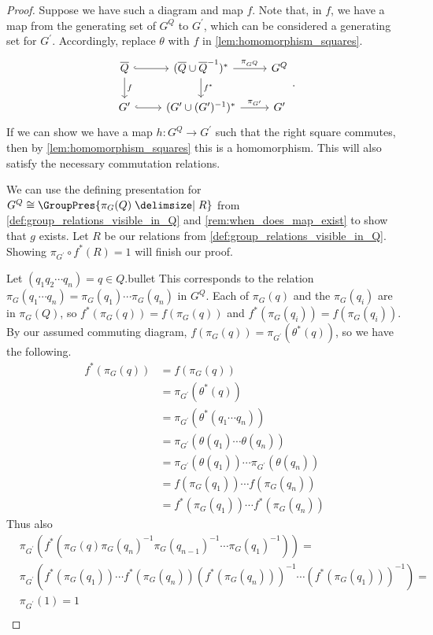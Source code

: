 \begin{proof}
	Suppose we have such a diagram and map $f$. Note that, in $f$, we have a map from the generating set of $G^Q$ to $G^\prime$, which can be considered a generating set for $G^\prime$. Accordingly, replace $\theta$ with  $f$ in \cref{lem:homomorphism_squares}.
	\[
		\begin{tikzcd}
			\overline{Q} \ar[d, "f"] \ar[r, hook] & (\overline{Q} \cup \overline{Q}^{-1})^* \ar[d, "f^*"] \ar[r, "\pi_{G^Q}"] & G^Q \\
			G^\prime \ar[r, hook] & (G^\prime \cup (G^\prime)^{-1})^* \ar[r, "\pi_{G^\prime}"] & G^\prime
		\end{tikzcd}
		.\]
	If we can show we have a map $h \colon G^Q \to G^\prime$ such that the right square commutes, then by \cref{lem:homomorphism_squares} this is a homomorphism. This will also satisfy the necessary commutation relations.

	We can use the defining presentation for $G^Q \cong \GroupPres{\pi_G(Q) \relations R}$ from \cref{def:group_relations_visible_in_Q} and \cref{rem:when_does_map_exist} to show that $g$ exists. Let $R$ be our relations from \cref{def:group_relations_visible_in_Q}. Showing $\pi_{G^\prime} \circ f^*\left( R \right) = 1 $ will finish our proof.

	Let $(q_1q_2\cdots q_n) = q \in Q$.bullet
	This corresponds to the relation $\pi_G(q_1\cdots q_n) = \pi_G(q_1)\cdots \pi_G(q_n) $ in $G^Q$.
	Each of $\pi_G(q)$ and the  $\pi_G(q_i)$ are in  $\pi_G(Q)$, so  $f^*(\pi_G(q)) = f(\pi_G(q))$ and  $f^*(\pi_G(q_i)) = f(\pi_G(q_i))$.
	By our assumed commuting diagram,  $f(\pi_G(q)) = \pi_{G^\prime}(\theta^*(q))$, so we have the following.
	\begin{align*}
		f^*(\pi_G(q)) & = f(\pi_G(q))                                                    \\
		                 & = \pi_{G^\prime}(\theta^*(q))                                 \\
		                 & = \pi_{G^\prime}(\theta^*(q_1\cdots q_n))                     \\
		                 & = \pi_{G^\prime}(\theta(q_1) \cdots \theta(q_n))                 \\
		                 & = \pi_{G^\prime}(\theta(q_1)) \cdots \pi_{G^\prime}(\theta(q_n)) \\
		                 & = f(\pi_G(q_1)) \cdots f(\pi_G(q_n))                             \\
		                 & = f^*(\pi_G(q_1)) \cdots f^*(\pi_G(q_n))
	\end{align*}
	Thus also
	\begin{align*}
		 & \pi_{G^\prime}(f^*(\pi_G(q)\pi_G(q_n)^{-1}\pi_G(q_{n-1})^{-1} \cdots \pi_G(q_1)^{-1})) =                            \\
		 & \pi_{G^\prime}(f^*(\pi_G(q_1))\cdots f^*(\pi_G(q_n))(f^*(\pi_G(q_n)))^{-1}\cdots (f^*(\pi_G(q_1)))^{-1}) = \\
		 & \pi_{G^\prime}(1)  = 1                                                                                                 \\
	\end{align*}
\end{proof}

